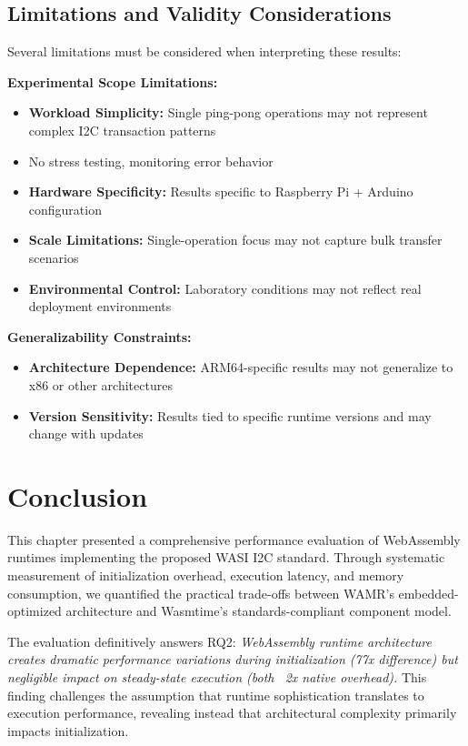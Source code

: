 \subsection{Limitations and Validity Considerations}
\label{subsec:limitations}

Several limitations must be considered when interpreting these results:

\textbf{Experimental Scope Limitations:}
\begin{itemize}
    \item \textbf{Workload Simplicity:} Single ping-pong operations may not represent complex I2C transaction patterns
    \item No stress testing, monitoring error behavior
    \item \textbf{Hardware Specificity:} Results specific to Raspberry Pi + Arduino configuration
    \item \textbf{Scale Limitations:} Single-operation focus may not capture bulk transfer scenarios
    \item \textbf{Environmental Control:} Laboratory conditions may not reflect real deployment environments
\end{itemize}

\textbf{Generalizability Constraints:}
\begin{itemize}
    \item \textbf{Architecture Dependence:} ARM64-specific results may not generalize to x86 or other architectures
    \item \textbf{Version Sensitivity:} Results tied to specific runtime versions and may change with updates
\end{itemize}






\section{Conclusion}
\label{sec:eval-conclusion}

This chapter presented a comprehensive performance evaluation of WebAssembly runtimes implementing the proposed WASI I2C standard. Through systematic measurement of initialization overhead, execution latency, and memory consumption, we quantified the practical trade-offs between WAMR's embedded-optimized architecture and Wasmtime's standards-compliant component model.

The evaluation definitively answers RQ2: \textit{WebAssembly runtime architecture creates dramatic performance variations during initialization (77x difference) but negligible impact on steady-state execution (both ~2x native overhead).} This finding challenges the assumption that runtime sophistication translates to execution performance, revealing instead that architectural complexity primarily impacts initialization.

